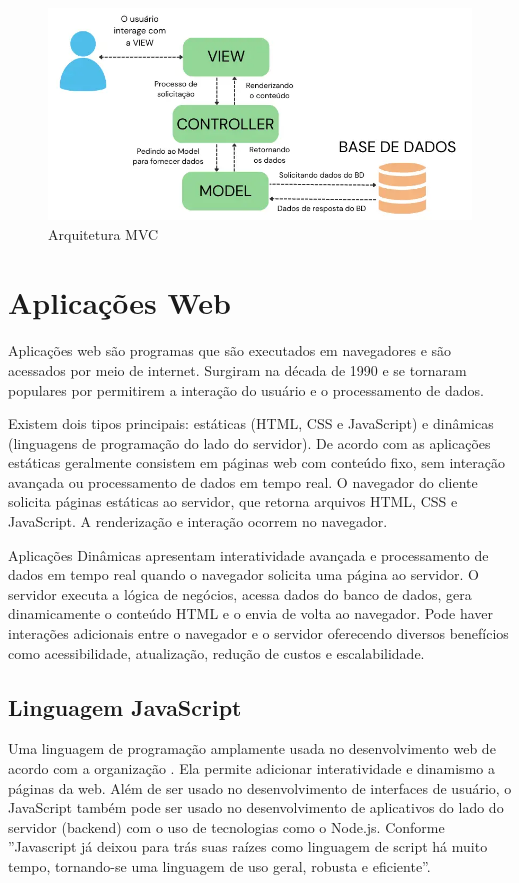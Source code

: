 \begin{figure}[htb]
    \caption{\label{fig:grafico-mvc}Arquitetura MVC}
    \begin{center}
        \includegraphics[scale=0.7]{imagens/arquitetura-mvc.png}
    \end{center}
\end{figure}


\section{Aplicações Web}
Aplicações web são programas que são executados em navegadores e são acessados por meio de internet.
Surgiram na década de 1990 e se tornaram populares por permitirem a interação do usuário e o processamento de dados.

Existem dois tipos principais: estáticas (HTML, CSS e JavaScript) e dinâmicas (linguagens de programação do lado do servidor).
De acordo com \cite{aplicacoesWeb} as aplicações estáticas geralmente consistem em páginas web com conteúdo fixo, sem interação avançada ou processamento de dados em tempo real. O navegador do cliente solicita páginas estáticas ao servidor, que retorna arquivos HTML, CSS e JavaScript. A renderização e interação ocorrem no navegador.

Aplicações Dinâmicas apresentam interatividade avançada e processamento de dados em tempo real quando o navegador solicita uma página ao servidor. O servidor executa a lógica de negócios, acessa dados do banco de dados, gera dinamicamente o conteúdo HTML e o envia de volta ao navegador. Pode haver interações adicionais entre o navegador e o servidor \cite{aplicacoesWeb}
oferecendo diversos benefícios como acessibilidade, atualização, redução de custos e escalabilidade.

\subsection{Linguagem JavaScript}
Uma linguagem de programação amplamente usada no desenvolvimento web de acordo com a organização \cite{mozillaJavaScript}. Ela permite adicionar interatividade e dinamismo a páginas da web. Além de ser usado no desenvolvimento de interfaces de usuário, o JavaScript também pode ser usado no desenvolvimento de aplicativos do lado do servidor (backend) com o uso de tecnologias como o Node.js. Conforme \cite{flanagan2012javascript} ''Javascript já deixou para trás suas raízes como linguagem de script há muito tempo, tornando-se uma linguagem de uso geral, robusta e eficiente''.

